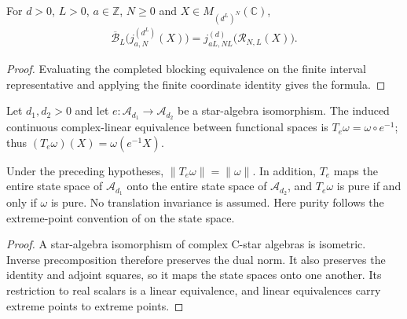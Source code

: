 \begin{lemma}
    \label{thm:qca_blocking_quasi_local_interval}
    \leanok
    For $d>0$, $L>0$, $a\in\mathbb Z$, $N\geq0$ and
    $X\in M_{(d^L)^N}(\mathbb C)$,
    \begin{align}
        \overline{\mathcal B}_L
        \bigl(j^{(d^L)}_{a,N}(X)\bigr)
        =j^{(d)}_{aL,NL}\bigl(\mathcal R_{N,L}(X)\bigr).
    \end{align}
\end{lemma}
\begin{proof}\leanok
    Evaluating the completed blocking equivalence on the finite interval
    representative and applying the finite coordinate identity gives the formula.
\end{proof}

\begin{definition}
    \label{def:qca_functional_star_equivalence}
    \leanok
    Let $d_1,d_2>0$ and let
    $e:\mathcal A_{d_1}\to\mathcal A_{d_2}$ be a star-algebra isomorphism.
    The induced continuous complex-linear equivalence between functional
    spaces is $T_e\omega=\omega\circ e^{-1}$; thus
    $(T_e\omega)(X)=\omega(e^{-1}X)$.
\end{definition}

\begin{lemma}
    \label{thm:qca_state_purity_star_equivalence}
    \leanok
    Under the preceding hypotheses, $\|T_e\omega\|=\|\omega\|$.
    In addition, $T_e$ maps the entire state space of $\mathcal A_{d_1}$ onto
    the entire state space of $\mathcal A_{d_2}$, and $T_e\omega$ is pure
    if and only if $\omega$ is pure. No translation invariance is assumed.
    Here purity follows the extreme-point convention of
    \cite[Section~3, lines~1469--1482]{Nachtergaele1996Spectral} on the state space.
\end{lemma}
\begin{proof}\leanok
    A star-algebra isomorphism of complex C-star algebras is isometric.
    Inverse precomposition therefore preserves the dual norm. It also
    preserves the identity and adjoint squares, so it maps the state spaces
    onto one another. Its restriction to real scalars is a linear
    equivalence, and linear equivalences carry extreme points to extreme
    points.
\end{proof}

